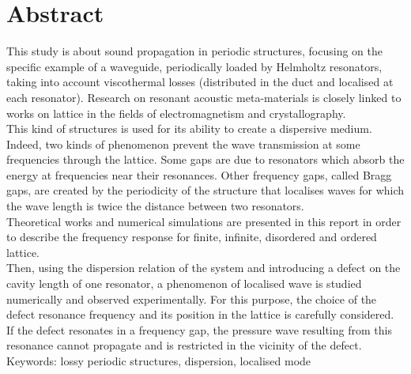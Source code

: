 \section*{Abstract}


This study is about sound propagation in periodic structures, focusing on the specific example of a waveguide, periodically loaded by Helmholtz resonators, taking into account viscothermal losses (distributed in the duct and localised at each resonator). Research on resonant acoustic meta-materials is closely linked to works on lattice in the fields of electromagnetism and crystallography.\\

This kind of structures is used for its ability to create a dispersive medium. Indeed, two kinds of phenomenon prevent the wave transmission at some frequencies through the lattice. Some gaps are due to resonators which absorb the energy at frequencies near their resonances. Other frequency gaps, called Bragg gaps, are created by the periodicity of the structure that localises waves for which the wave length is twice the distance between two resonators.\\

Theoretical works and numerical simulations are presented in this report in order to describe the frequency response for finite, infinite, disordered and ordered lattice.\\


Then, using the dispersion relation of the system and introducing a defect on the cavity length of one resonator, a phenomenon of localised wave is studied numerically and observed experimentally. For this purpose, the choice of the defect resonance frequency and its position in the lattice is carefully considered. If the defect resonates in a frequency gap, the pressure wave resulting from this resonance cannot propagate and is restricted in the vicinity of the defect. \\


Keywords: lossy periodic structures, dispersion, localised mode 
